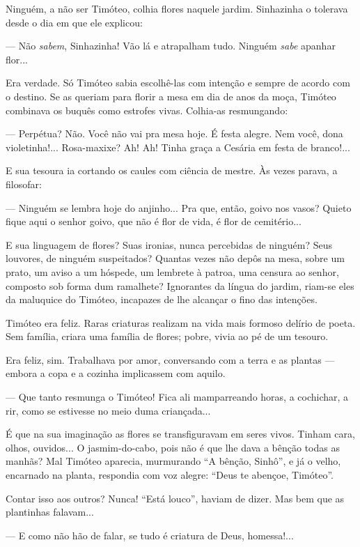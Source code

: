 Ninguém, a não ser Timóteo, colhia flores naquele jardim. Sinhazinha o
tolerava desde o dia em que ele explicou:

--- Não \emph{sabem}, Sinhazinha! Vão lá e atrapalham tudo. Ninguém
\emph{sabe} apanhar flor...

Era verdade. Só Timóteo sabia escolhê-las com intenção e sempre de
acordo com o destino. Se as queriam para florir a mesa em dia de anos da
moça, Timóteo combinava os buquês como estrofes vivas. Colhia-as
resmungando:

--- Perpétua? Não. Você não vai pra mesa hoje. É festa alegre. Nem você,
dona violetinha!... Rosa-maxixe? Ah! Ah! Tinha graça a Cesária em festa
de branco!...

E sua tesoura ia cortando os caules com ciência de mestre. Às vezes
parava, a filosofar:

--- Ninguém se lembra hoje do anjinho... Pra que, então, goivo nos
vasos? Quieto fique aqui o senhor goivo, que não é flor de vida, é flor
de cemitério...

E sua linguagem de flores? Suas ironias, nunca percebidas de ninguém?
Seus louvores, de ninguém suspeitados? Quantas vezes não depôs na mesa,
sobre um prato, um aviso a um hóspede, um lembrete à patroa, uma censura
ao senhor, composto sob forma dum ramalhete? Ignorantes da língua do
jardim, riam-se eles da maluquice do Timóteo, incapazes de lhe alcançar
o fino das intenções.

Timóteo era feliz. Raras criaturas realizam na vida mais formoso delírio
de poeta. Sem família, criara uma família de flores; pobre, vivia ao pé
de um tesouro.

Era feliz, sim. Trabalhava por amor, conversando com a terra e as
plantas --- embora a copa e a cozinha implicassem com aquilo.

--- Que tanto resmunga o Timóteo! Fica ali mamparreando horas, a
cochichar, a rir, como se estivesse no meio duma criançada...

É que na sua imaginação as flores se transfiguravam em seres vivos.
Tinham cara, olhos, ouvidos... O jasmim-do-cabo, pois não é que lhe dava
a bênção todas as manhãs? Mal Timóteo aparecia, murmurando ``A bênção,
Sinhô'', e já o velho, encarnado na planta, respondia com voz alegre:
``Deus te abençoe, Timóteo''.

Contar isso aos outros? Nunca! ``Está louco'', haviam de dizer. Mas bem
que as plantinhas falavam...

--- E como não hão de falar, se tudo é criatura de Deus, homessa!...

